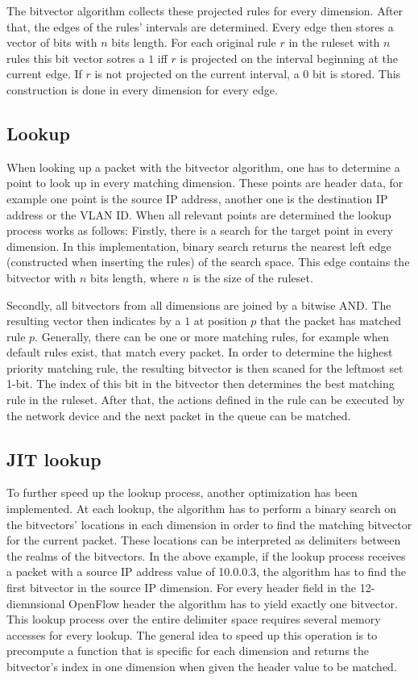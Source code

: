 \documentclass[a4paper,
		12pt,
		parskip=full,
		titlepage
		]{scrartcl}
\begin{document}
The bitvector algorithm collects these projected rules for every dimension.
After that, the edges of the rules' intervals are determined.
Every edge then stores a vector of bits with $n$ bits length.
For each original rule $r$ in the ruleset with $n$ rules this bit vector sotres a $1$ iff $r$ is projected on the interval beginning at the current edge.
If $r$ is not projected on the current interval, a $0$ bit is stored.
This construction is done in every dimension for every edge.

\subsection{Lookup}
When looking up a packet with the bitvector algorithm, one has to determine a point to look up in every matching dimension.
These points are header data, for example one point is the source IP address, another one is the destination IP address or the VLAN ID.
When all relevant points are determined the lookup process works as follows:
Firstly, there is a search for the target point in every dimension.
In this implementation, binary search returns the nearest left edge (constructed when inserting the rules) of the search space.
This edge contains the bitvector with $n$ bits length, where $n$ is the size of the ruleset.

Secondly, all bitvectors from all dimensions are joined by a bitwise AND.
The resulting vector then indicates by a $1$ at position $p$ that the packet has matched rule $p$.
Generally, there can be one or more matching rules, for example when default rules exist, that match every packet.
In order to determine the highest priority matching rule, the resulting bitvector is then scaned for the leftmost set 1-bit.
The index of this bit in the bitvector then determines the best matching rule in the ruleset.
After that, the actions defined in the rule can be executed by the network device and the next packet in the queue can be matched.

\subsection{JIT lookup}
To further speed up the lookup process, another optimization has been implemented.
At each lookup, the algorithm has to perform a binary search on the bitvectors' locations in each dimension in order to find the matching bitvector for the current packet.
These locations can be interpreted as delimiters between the realms of the bitvectors.
In the above example, if the lookup process receives a packet with a source IP address value of 10.0.0.3, the algorithm has to find the first bitvector in the source IP dimension. %
For every header field in the 12-diemnsional OpenFlow header the algorithm has to yield exactly one bitvector.
This lookup process over the entire delimiter space requires several memory accesses for every lookup.
The general idea to speed up this operation is to precompute a function that is specific for each dimension and returns the bitvector's index in one dimension when given the header value to be matched.
\end{document}
